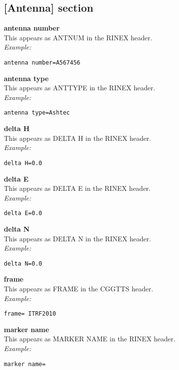 \subsection{[Antenna] section}

\hypertarget{h:antenna}{}
{\bfseries antenna number}\\
This appears as ANTNUM in the RINEX header.\\
\textit{Example:}
\begin{lstlisting}
antenna number=A567456
\end{lstlisting}

{\bfseries antenna type}\\
This appears as ANTTYPE in the RINEX header.\\
\textit{Example:}
\begin{lstlisting}
antenna type=Ashtec
\end{lstlisting}

{\bfseries delta H}\\
This appears as DELTA H in the RINEX header.\\
\textit{Example:}
\begin{lstlisting}
delta H=0.0
\end{lstlisting}

{\bfseries delta E}\\
This appears as DELTA E in the RINEX header.\\
\textit{Example:}
\begin{lstlisting}
delta E=0.0
\end{lstlisting}

{\bfseries delta N}\\
This appears as DELTA N in the RINEX header.\\
\textit{Example:}
\begin{lstlisting}
delta N=0.0
\end{lstlisting}

{\bfseries frame}\\
This appears as FRAME in the CGGTTS header.\\
\textit{Example:}
\begin{lstlisting}
frame= ITRF2010
\end{lstlisting}

{\bfseries marker name}\\
This appears as MARKER NAME in the RINEX header.\\
\textit{Example:}
\begin{lstlisting}
marker name=
\end{lstlisting}

